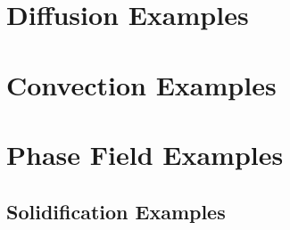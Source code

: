 \documentclass[letterpaper,twoside,openright,10pt]{memoir}
\begin{document}


\renewcommand{\ptctitle}{Example Contents}
\parttoc

\chapter{Diffusion Examples}


% 


% 

% 

% 


\chapter{Convection Examples}


% 

% 
% 

\chapter{Phase Field Examples}

\section*{Solidification Examples}
\end{document}
